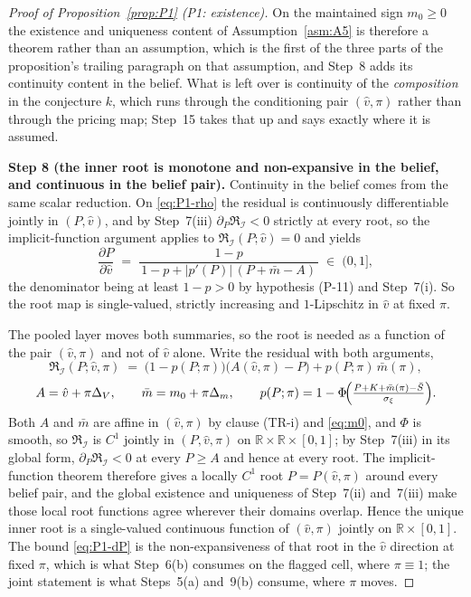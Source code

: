 \documentclass[11pt]{article}
\begin{document}
\begin{proof}[Proof of Proposition~\ref{prop:P1} (P1: existence)]
On the maintained sign $m_0 \ge 0$ the existence and uniqueness content of Assumption~\ref{asm:A5} is
therefore a theorem rather than an assumption, which is the first of the three parts of the
proposition's trailing paragraph on that assumption, and Step~8 adds its continuity content in the
belief. What is left over is continuity of the \emph{composition} in the conjecture $k$, which runs
through the conditioning pair $(\hat v,\pi)$ rather than through the pricing map; Step~15 takes that
up and says exactly where it is assumed.

\smallskip
\noindent\textbf{Step 8 (the inner root is monotone and non-expansive in the belief, and continuous
in the belief pair).}
Continuity in the belief comes from the same scalar reduction. On \eqref{eq:P1-rho} the residual is
continuously differentiable jointly in $(P,\hat v)$, and by Step~7(iii) $\partial_P\mathfrak R_{\mathcal I} < 0$
strictly at every root, so the implicit-function argument applies to $\mathfrak R_{\mathcal I}(P;\hat v) = 0$ and
yields
\begin{equation}
\label{eq:P1-dP}
\frac{\partial P}{\partial \hat v}
\;=\; \frac{1-p}{\,1-p+\lvert p'(P)\rvert\,(P+\bar m-A)\,}
\;\in\; (0,1],
\end{equation}
the denominator being at least $1-p > 0$ by hypothesis (P-11) and Step~7(i). So the root map is
single-valued, strictly increasing and $1$-Lipschitz in $\hat v$ at fixed $\pi$.

The pooled layer moves both summaries, so the root is needed as a function of the pair
$(\hat v,\pi)$ and not of $\hat v$ alone. Write the residual with both arguments,
\[
\mathfrak R_{\mathcal I}(P;\hat v,\pi) \;=\; \bigl(1-p(P;\pi)\bigr)\bigl(A(\hat v,\pi)-P\bigr) + p(P;\pi)\,\bar m(\pi),
\]
\[
A = \hat v + \pi\Delta_V,
\qquad
\bar m = m_0 + \pi\Delta_m,
\qquad
p(P;\pi) = 1-\Phi\!\Bigl(\tfrac{P+K+\bar m(\pi)-\bar S}{\sigma_\xi}\Bigr).
\]
Both $A$ and $\bar m$ are affine in $(\hat v,\pi)$ by clause (TR-i) and \eqref{eq:m0}, and $\Phi$ is
smooth, so $\mathfrak R_{\mathcal I}$ is $C^1$ jointly in $(P,\hat v,\pi)$ on $\mathbb R \times \mathbb R \times
[0,1]$; by Step~7(iii) in its global form, $\partial_P\mathfrak R_{\mathcal I} < 0$ at every $P \ge A$ and hence at
every root. The implicit-function theorem therefore gives a locally $C^1$ root
$P = P(\hat v,\pi)$ around every belief pair, and the global existence and uniqueness of Step~7(ii)
and~7(iii) make those local root functions agree wherever their domains overlap. Hence the unique
inner root is a single-valued continuous function of $(\hat v,\pi)$ jointly on
$\mathbb R \times [0,1]$. The bound \eqref{eq:P1-dP} is the non-expansiveness of that root in the
$\hat v$ direction at fixed $\pi$, which is what Step~6(b) consumes on the flagged cell, where
$\pi \equiv 1$; the joint statement is what Steps~5(a) and~9(b) consume, where $\pi$ moves.


\end{proof}
\end{document}
